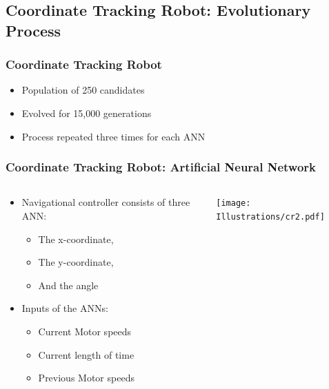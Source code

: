 \documentclass{beamer}
\begin{document}
\subsection{Coordinate Tracking Robot: Evolutionary Process}
\begin{frame}
  \frametitle{Coordinate Tracking Robot}
  \begin{itemize}
   \item Population of 250 candidates
   \item Evolved for 15,000 generations
   \item Process repeated three times for each ANN

  \end{itemize}
\end{frame}



\begin{frame}
  \frametitle{Coordinate Tracking Robot: Artificial Neural Network}
  \begin{columns}
  \begin{column}{0.5\textwidth}
\begin{itemize}
\item Navigational controller consists of three ANN:
\begin{itemize}
\item The x-coordinate,
\item The y-coordinate,
\item And the angle
\end{itemize}
\item Inputs of the ANNs:
\begin{itemize}
\item Current Motor speeds
\item Current length of time
\item Previous Motor speeds
\end{itemize}
\end{itemize}
\end{column}
\begin{column}{0.5\textwidth}
 \texttt{[image: Illustrations/cr2.pdf]}
       \\
\end{column}
\end{columns}
\end{frame}
\end{document}
